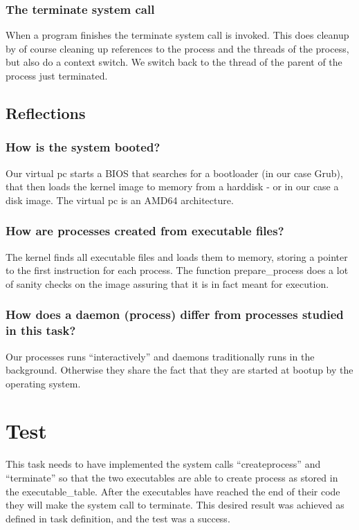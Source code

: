 \subsubsection*{The terminate system call}
When a program finishes the terminate system call is invoked. This does cleanup by of course cleaning up references to the process 
and the threads of the process, but also do a context switch. We switch back to the thread of the parent of the process just terminated.

\subsection{Reflections}

\subsubsection*{How is the system booted?}
Our virtual pc starts a BIOS that searches for a bootloader (in our case Grub), that then loads the kernel image to memory from a harddisk - or in our case a disk image. The virtual pc is an AMD64 architecture.

\subsubsection*{How are processes created from executable files?}
The kernel finds all executable files and loads them to memory, storing a pointer to the first instruction for each process. The function prepare\_process does a lot of sanity checks on the image assuring that it is in fact meant for execution.

\subsubsection*{How does a daemon (process) differ from processes studied in this task?}
Our processes runs ``interactively'' and daemons traditionally runs in the background. Otherwise they share the fact that they are started at bootup by the operating system.

\section{Test}
This task needs to have implemented the system calls ``createprocess'' and ``terminate'' so that the two executables are able to create process as stored in the executable\_table. After the executables have reached the end of their code they will make the system call to terminate. This desired result was achieved as defined in task definition, and the test was a success.